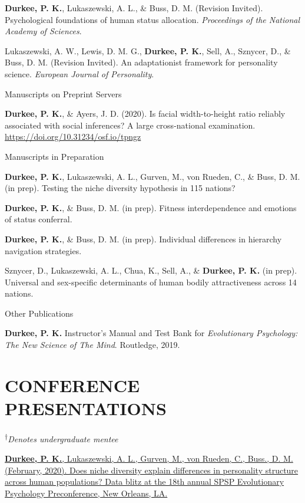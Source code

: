 \documentclass[10.5pt,]{article}
\begin{document}
\hangindent=0.5in \textbf{Durkee, P. K.}, Lukaszewski, A. L., \& Buss,
D. M. (Revision Invited). Psychological foundations of human status
allocation. \emph{Proceedings of the National Academy of Sciences}.

\hangindent=0.5in Lukaszewski, A. W., Lewis, D. M. G., \textbf{Durkee,
P. K.}, Sell, A., Sznycer, D., \& Buss, D. M. (Revision Invited). An
adaptationist framework for personality science. \emph{European Journal
of Personality}.

\textcolor{light-gray}{Manuscripts on Preprint Servers}

\hangindent=0.5in \textbf{Durkee, P. K.}, \& Ayers, J. D. (2020). Is
facial width-to-height ratio reliably associated with social inferences?
A large cross-national examination.
\url{https://doi.org/10.31234/osf.io/tpngz}

\textcolor{light-gray}{Manuscripts in Preparation}

\hangindent=0.5in \textbf{Durkee, P. K.}, Lukaszewski, A. L., Gurven,
M., von Rueden, C., \& Buss, D. M. (in prep). Testing the niche
diversity hypothesis in 115 nations?

\hangindent=0.5in \textbf{Durkee, P. K.}, \& Buss, D. M. (in prep).
Fitness interdependence and emotions of status conferral.

\hangindent=0.5in \textbf{Durkee, P. K.}, \& Buss, D. M. (in prep).
Individual differences in hierarchy navigation strategies.

\hangindent=0.5in Sznycer, D., Lukaszewski, A. L., Chua, K., Sell, A.,
\& \textbf{Durkee, P. K.} (in prep). Universal and sex-specific
determinants of human bodily attractiveness across 14 nations.

\textcolor{light-gray}{Other Publications}

\hangindent=0.5in \textbf{Durkee, P. K.} Instructor's Manual and Test
Bank for \emph{Evolutionary Psychology: The New Science of The Mind}.
Routledge, 2019.

\hypertarget{conference-presentations}{%
\section{CONFERENCE PRESENTATIONS}\label{conference-presentations}}

\textsuperscript{†}\emph{Denotes undergraduate mentee}

\hangindent=0.5in \href{https://osf.io/6gp85/}{\textbf{Durkee, P. K.},
Lukaszewski, A. L., Gurven, M., von Rueden, C., Buss., D. M. (February,
2020). Does niche diversity explain differences in personality structure
across human populations? Data blitz at the 18th annual SPSP
Evolutionary Psychology Preconference, New Orleans, LA.}
\end{document}
